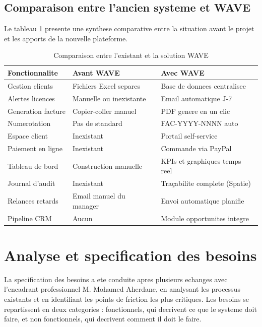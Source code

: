 \documentclass[12pt, a4paper]{report}
\begin{document}
\subsection{Comparaison entre l'ancien systeme et WAVE}

Le tableau \ref{tab:comparaison} presente une synthese comparative entre
la situation avant le projet et les apports de la nouvelle plateforme.

\vspace{0.4cm}
\begin{table}[H]
\centering
\caption{Comparaison entre l'existant et la solution WAVE}
\label{tab:comparaison}
\begin{tabularx}{\textwidth}{@{}lXX@{}}
\toprule
\textbf{Fonctionnalite} & \textbf{Avant WAVE} & \textbf{Avec WAVE} \\
\midrule
Gestion clients    & Fichiers Excel separes  & Base de donnees centralisee \\[4pt]
Alertes licences   & Manuelle ou inexistante & Email automatique J-7 \\[4pt]
Generation facture & Copier-coller manuel    & PDF genere en un clic \\[4pt]
Numerotation       & Pas de standard         & FAC-YYYY-NNNN auto \\[4pt]
Espace client      & Inexistant              & Portail self-service \\[4pt]
Paiement en ligne  & Inexistant              & Commande via PayPal \\[4pt]
Tableau de bord    & Construction manuelle   & KPIs et graphiques temps reel \\[4pt]
Journal d'audit    & Inexistant              & Traçabilite complete (Spatie) \\[4pt]
Relances retards   & Email manuel du manager & Envoi automatique planifie \\[4pt]
Pipeline CRM       & Aucun                   & Module opportunites integre \\
\bottomrule
\end{tabularx}
\end{table}

\section{Analyse et specification des besoins}

La specification des besoins a ete conduite apres plusieurs echanges avec
l'encadrant professionnel M. Mohamed Aherdane, en analysant les processus
existants et en identifiant les points de friction les plus critiques. Les
besoins se repartissent en deux categories : fonctionnels, qui decrivent ce
que le systeme doit faire, et non fonctionnels, qui decrivent comment il doit
le faire.
\end{document}

